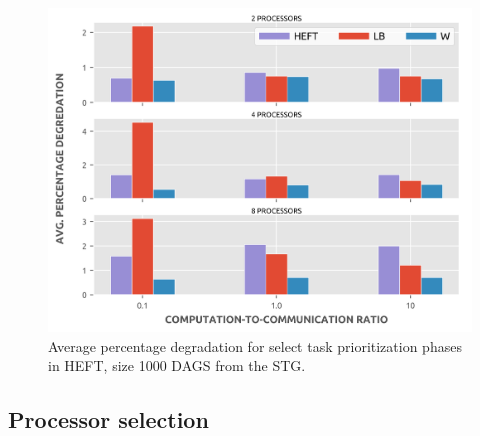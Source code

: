 \documentclass[12pt]{article}
\begin{document}
\begin{figure}
	\centering	
	\includegraphics[scale=0.8]{1000tasks_apd.png}
	\caption{Average percentage degradation for select task prioritization phases in HEFT, size 1000 DAGS from the STG.}	
	\label{plot.rankings_apd_1000}
\end{figure}

\subsection{Processor selection}
\label{subsect.results_selection}
\end{document}
